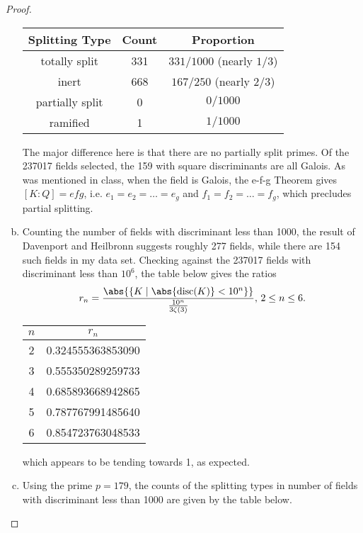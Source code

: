 \documentclass[10pt]{amsart}
\begin{document}
\begin{thm}
\begin{proof}
\begin{enumerate}[(a)]
\begin{center}
\begin{tabular}{|c|c|c|}
          Splitting Type & Count & Proportion\\
          \hline
          totally split & 331 & $331/1000$ (nearly $1/3$)\\
          \hline
          inert & 668 & $167/250$ (nearly $2/3$)\\ 
          \hline
          partially split & 0 & $0/1000$\\
          \hline
          ramified & 1 & $1/1000$\\
          \hline
        \end{tabular}
      \end{center}
        The major difference here is that there are no partially split primes.
        Of the 237017 fields selected, the 159 with square discriminants are all Galois.
        As was mentioned in class, when the field is Galois, the e-f-g Theorem gives $[K : Q] = efg$, i.e. $e_1 = e_2 = \ldots = e_g$ and $f_1 = f_2 = \ldots = f_g$, which precludes partial splitting.
      \item
        Counting the number of fields with discriminant less than 1000, the result of Davenport and Heilbronn suggests roughly 277 fields, while there are 154 such fields in my data set.
        Checking against the 237017 fields with discriminant less than $10^6$, the table below gives the ratios 
        $$r_n = \frac{\abs{\left\{K \;\middle\vert\; \abs{\operatorname{disc}(K)} < 10^n \right\}}}{\frac{10^n}{3\zeta(3)}},\, 2 \leq n \leq 6.$$ 
        \begin{center}
          \begin{tabular}{|c|c|}
            \hline
            $n$ & $r_n$\\
            \hline
            2 & 0.324555363853090\\
            \hline
            3 & 0.555350289259733\\
            \hline
            4 & 0.685893668942865\\
            \hline
            5 & 0.787767991485640\\
            \hline
            6 & 0.854723763048533\\
            \hline
          \end{tabular}
        \end{center}
        which appears to be tending towards 1, as expected. 
      \item
        Using the prime $p = 179$, the counts of the splitting types in number of fields with discriminant less than 1000 are given by the table below.

\end{enumerate}
\end{proof}
\end{thm}
\end{document}
